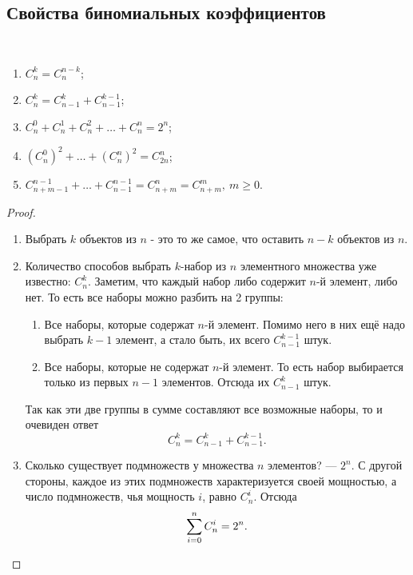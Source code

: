 \begin{multicols}{2}
    \subsection*{Свойства биномиальных коэффициентов}
    
    \begin{theorema}{}{}~
      \begin{enumerate}
        \item $C_n^k = C_n^{n - k}$;
        \item $C_n^k = C_{n - 1}^k + C_{n - 1}^{k - 1}$;
        \item $C_n^0 + C_n^1 + C_n^2 + \ldots + C_n^n = 2^n$;
        \item $\left(C_n^0\right)^2 + \ldots + \left(C_n^n\right)^2 = C_{2n}^n$;
        \item $C_{n + m - 1}^{n - 1} + \ldots + C_{n - 1}^{n - 1} = C_{n + m}^n = C_{n + m}^m,\ m \ge 0$.
      \end{enumerate}
    \end{theorema}
    
    \begin{proof}~
      \begin{enumerate}
        \item Выбрать $k$ объектов из $n$ - это то же самое, что оставить $n - k$ объектов из $n$.
        
        \item Количество способов выбрать $k$-набор из $n$ элементного множества уже известно: $C_n^k$. Заметим, что каждый набор либо содержит $n$-й элемент, либо нет. То есть все наборы можно разбить на 2 группы:
        \begin{enumerate}
          \item Все наборы, которые содержат $n$-й элемент. Помимо него в них ещё надо выбрать $k - 1$ элемент, а стало быть, их всего $C_{n - 1}^{k - 1}$ штук.
          
          \item Все наборы, которые не содержат $n$-й элемент. То есть набор выбирается только из первых $n - 1$ элементов. Отсюда их $C_{n - 1}^k$ штук.
        \end{enumerate}
        Так как эти две группы в сумме составляют все возможные наборы, то и очевиден ответ
        \[
          C_n^k = C_{n - 1}^k + C_{n - 1}^{k - 1}.
        \]
        
        \item Сколько существует подмножеств у множества $n$ элементов? --- $2^n$. С другой стороны, каждое из этих подмножеств характеризуется своей мощностью, а число подмножеств, чья мощность $i$, равно $C_n^i$. Отсюда
        \[
          \sum\limits_{i = 0}^n C_n^i = 2^n.
        \]
        

\end{enumerate}
\end{proof}
\end{multicols}

